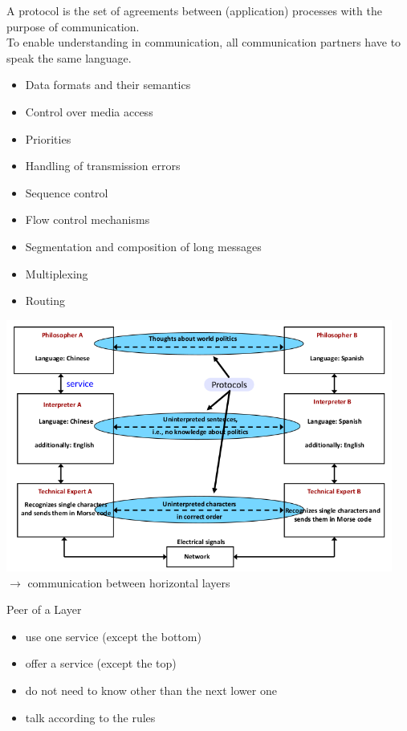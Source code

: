 \documentclass[11pt,ngerman]{article}
\begin{document}
A	protocol	is	the	set	of	agreements	between	(application)	processes	with	the	purpose	of	
communication.\\
To	enable	understanding	in	communication,	all	communication	partners	have	to	speak	the	
same	language.
\begin{itemize}[noitemsep,nolistsep]
\item Data	formats	and	their	semantics
\item Control	over	media	access
\item Priorities
\item Handling	of	transmission	errors
\item Sequence	control
\item Flow	control	mechanisms
\item Segmentation	and	composition	of	long	messages
\item Multiplexing
\item Routing
\end{itemize}
	\includegraphics[width=5in]{images/Selection_006.png}\\
	$\rightarrow$ communication between horizontal layers
	
\noindent Peer	of	a	Layer
\begin{itemize}[noitemsep,nolistsep]
\item
use	one	service	
(except	the	bottom)
\item
offer	a	service	
(except	the	top)
\item
do	not	need	to	know	other	
than	the	next	lower	one
\item
talk	according	to	the	rules
\end{itemize}
\end{document}
